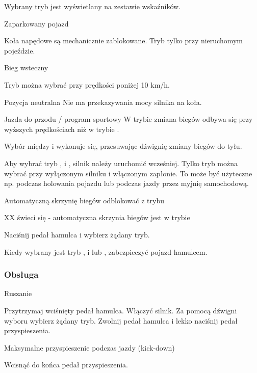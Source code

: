 Wybrany tryb jest wyświetlany na zestawie wskaźników.


\gearP Zaparkowany pojazd

Koła napędowe są mechanicznie zablokowane.
Tryb \gearP tylko przy nieruchomym pojeździe.

\gearR Bieg wsteczny

Tryb \gearR można wybrać przy prędkości poniżej 10 km/h.

\gearN Pozycja neutralna
Nie ma przekazywania mocy silnika na koła.

\gearDS Jazda do przodu / program sportowy
W trybie \gearS zmiana biegów odbywa się przy wyższych prędkościach niż w trybie \gearD.

Wybór między \gearD i \gearS wykonuje się, przesuwając dźwignię zmiany biegów do tyłu.

Aby wybrać tryb \gearD, \gearS i \gearR, silnik należy uruchomić wcześniej. Tylko tryb \gearN można wybrać przy wyłączonym silniku i włączonym zapłonie. To może być użyteczne np. podczas holowania pojazdu lub podczas jazdy przez myjnię samochodową.

Automatyczną skrzynię biegów odblokować z trybu \gearP

XX świeci się - automatyczna skrzynia biegów jest w trybie \gearP
\begin{itemizeArrow}
	\itemArrow Naciśnij pedał hamulca i wybierz żądany tryb.
\end{itemizeArrow}

\begin{itemizeTriangle}
	\itemTriangle Kiedy wybrany jest tryb \gearD, \gearS i \gearR lub \gearN, zabezpieczyć pojazd hamulcem.
\end{itemizeTriangle}

\subsubsection{Obsługa}

Ruszanie
\begin{itemizeArrow}
	\itemArrow Przytrzymaj wciśnięty pedał hamulca.
	\itemArrow Włączyć silnik.
	\itemArrow Za pomocą dźwigni wyboru wybierz żądany tryb.
	\itemArrow Zwolnij pedał hamulca i lekko naciśnij pedał przyspieszenia.
\end{itemizeArrow}

Maksymalne przyspieszenie podczas jazdy (kick-down)

\begin{itemizeArrow}
	\itemArrow Wcisnąć do końca pedał przyspieszenia.
\end{itemizeArrow}

